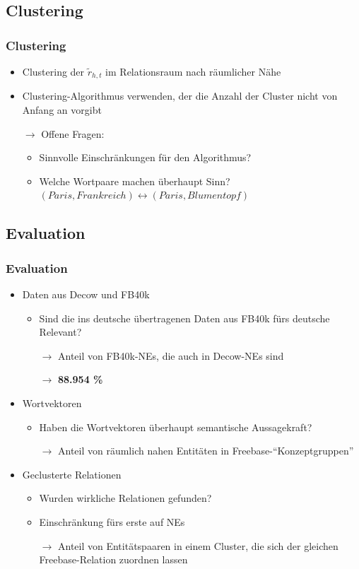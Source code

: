 \documentclass[10pt,xcolor={usenames,dvipsnames,svgnames,table}]{beamer}
\begin{document}
\begin{frame}
	\subsection{Clustering}
	\frametitle{Clustering}
	\begin{itemize}
		\item Clustering der $\tilde{r}_{h, t}$ im Relationsraum nach räumlicher Nähe
		\item Clustering-Algorithmus verwenden, der die Anzahl der Cluster nicht von Anfang an vorgibt
		\item[$\rightarrow$] Offene Fragen: 
		\begin{itemize}
			\item Sinnvolle Einschränkungen für den Algorithmus?
			\item Welche Wortpaare machen überhaupt Sinn? $(Paris, Frankreich) \leftrightarrow (Paris, Blumentopf)$
		\end{itemize}
	\end{itemize}
\end{frame}

\begin{frame}
	\section{Evaluation}
	\frametitle{Evaluation}
	\begin{itemize}
		\item Daten aus Decow und FB40k
		\begin{itemize}
			\item Sind die ins deutsche übertragenen Daten aus FB40k fürs deutsche Relevant?
			\item[$\rightarrow$] Anteil von FB40k-NEs, die auch in Decow-NEs sind
			\item[$\rightarrow$] \textbf{88.954 \%}
		\end{itemize}
		\item Wortvektoren
		\begin{itemize}
			\item Haben die Wortvektoren überhaupt semantische Aussagekraft?
			\item[$\rightarrow$] Anteil von räumlich nahen Entitäten in Freebase-``Konzeptgruppen''
		\end{itemize}
		\item Geclusterte Relationen
		\begin{itemize}
			\item Wurden wirkliche Relationen gefunden?
			\item Einschränkung fürs erste auf NEs
			\item[$\rightarrow$] Anteil von Entitätspaaren in einem Cluster, die sich der gleichen Freebase-Relation zuordnen lassen
		\end{itemize}
	\end{itemize}
\end{frame}
\end{document}
